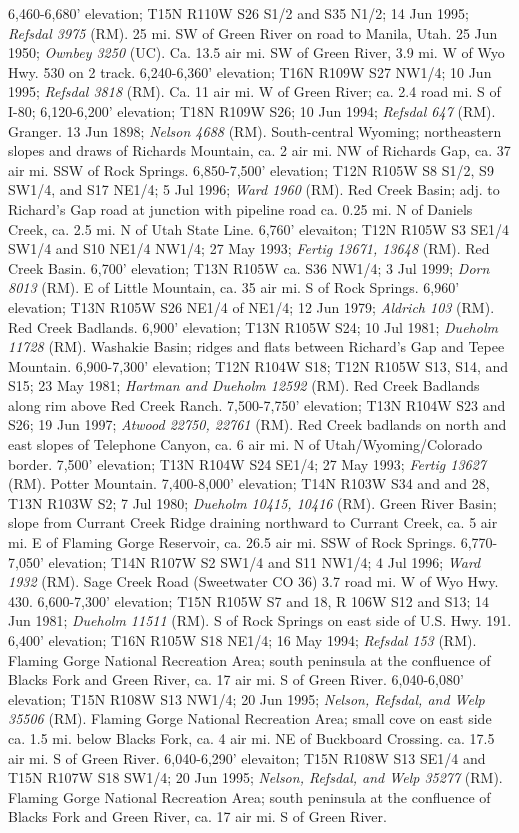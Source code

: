 6,460-6,680' elevation; T15N R110W S26 S1/2 and S35 N1/2; 14 Jun 1995; \textit{Refsdal 3975} (RM). 25 mi. SW of Green River on road to Manila, Utah. 25 Jun 1950; \textit{Ownbey 3250} (UC).  Ca. 13.5 air mi. SW of Green River, 3.9 mi. W of Wyo Hwy. 530 on 2 track. 6,240-6,360' elevation; T16N R109W S27 NW1/4; 10 Jun 1995; \textit{Refsdal 3818} (RM).  Ca. 11 air mi. W of Green River; ca. 2.4 road mi. S of I-80; 6,120-6,200' elevation; T18N R109W S26; 10 Jun 1994; \textit{Refsdal 647} (RM).  Granger. 13 Jun 1898; \textit{Nelson 4688} (RM).  South-central Wyoming; northeastern slopes and draws of Richards Mountain, ca. 2 air mi. NW of Richards Gap, ca. 37 air mi. SSW of Rock Springs. 6,850-7,500' elevation; T12N R105W S8 S1/2, S9 SW1/4, and S17 NE1/4; 5 Jul 1996; \textit{Ward 1960} (RM).  Red Creek Basin; adj. to Richard's Gap road at junction with pipeline road ca. 0.25 mi. N of Daniels Creek, ca. 2.5 mi. N of Utah State Line. 6,760' elevaiton; T12N R105W S3 SE1/4 SW1/4 and S10 NE1/4 NW1/4;	27 May 1993; \textit{Fertig 13671, 13648} (RM).  Red Creek Basin. 6,700' elevation; T13N R105W ca. S36 NW1/4; 3 Jul 1999; \textit{Dorn 8013} (RM).  E of Little Mountain, ca. 35 air mi. S of Rock Springs. 6,960' elevation; T13N R105W S26 NE1/4 of NE1/4; 12 Jun 1979; \textit{Aldrich 103} (RM).  Red Creek Badlands. 6,900' elevation; T13N R105W S24; 10 Jul 1981; \textit{Dueholm 11728} (RM).  Washakie Basin; ridges and flats between Richard's Gap and Tepee Mountain. 6,900-7,300' elevation; T12N R104W S18; T12N R105W S13, S14, and S15; 23 May 1981; \textit{Hartman and Dueholm 12592} (RM).  Red Creek Badlands along rim above Red Creek Ranch.	7,500-7,750' elevation; T13N R104W S23 and S26; 19 Jun 1997; \textit{Atwood 22750, 22761} (RM).  Red Creek badlands on north and east slopes of Telephone Canyon, ca. 6 air mi. N of Utah/Wyoming/Colorado border. 7,500' elevation; T13N R104W S24 SE1/4; 27 May 1993; \textit{Fertig 13627} (RM).  Potter Mountain. 7,400-8,000' elevation; T14N R103W S34 and and 28, T13N R103W S2; 7 Jul 1980; \textit{Dueholm 10415, 10416} (RM).  Green River Basin; slope from Currant Creek Ridge draining northward to Currant Creek, ca. 5 air mi. E of Flaming Gorge Reservoir, ca. 26.5 air mi. SSW of Rock Springs. 6,770-7,050' elevation; T14N R107W S2 SW1/4 and S11 NW1/4; 4 Jul 1996; \textit{Ward 1932} (RM).  Sage Creek Road (Sweetwater CO 36) 3.7 road mi. W of Wyo Hwy. 430. 6,600-7,300' elevation; T15N R105W S7 and 18, R 106W S12 and S13; 14 Jun 1981; \textit{Dueholm 11511} (RM).  S of Rock Springs on east side of U.S. Hwy. 191. 6,400' elevation; T16N R105W S18 NE1/4; 16 May 1994; \textit{Refsdal 153} (RM).  Flaming Gorge National Recreation Area; south peninsula at the confluence of Blacks Fork and Green River, ca. 17 air mi. S of Green River. 6,040-6,080' elevation; T15N R108W S13 NW1/4; 20 Jun 1995; \textit{Nelson, Refsdal, and Welp 35506} (RM).  Flaming Gorge National Recreation Area; small cove on east side ca. 1.5 mi. below Blacks Fork, ca. 4 air mi. NE of Buckboard Crossing. ca. 17.5 air mi. S of Green River. 6,040-6,290' elevaiton; T15N R108W S13 SE1/4 and T15N R107W S18 SW1/4; 20 Jun 1995; \textit{Nelson, Refsdal, and Welp 35277} (RM).  Flaming Gorge National Recreation Area; south peninsula at the confluence of Blacks Fork and Green River, ca. 17 air mi. S of Green River. 